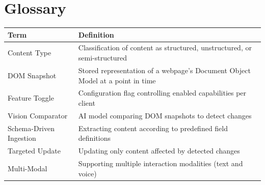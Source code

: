 \chapter{Glossary}

\begin{table}[H]
\centering
\begin{tabular}{|l|p{10cm}|}
\hline
\textbf{Term} & \textbf{Definition} \\
\hline
Content Type & Classification of content as structured, unstructured, or semi-structured \\
\hline
DOM Snapshot & Stored representation of a webpage's Document Object Model at a point in time \\
\hline
Feature Toggle & Configuration flag controlling enabled capabilities per client \\
\hline
Vision Comparator & AI model comparing DOM snapshots to detect changes \\
\hline
Schema-Driven Ingestion & Extracting content according to predefined field definitions \\
\hline
Targeted Update & Updating only content affected by detected changes \\
\hline
Multi-Modal & Supporting multiple interaction modalities (text and voice) \\
\hline
\end{tabular}
\end{table}
